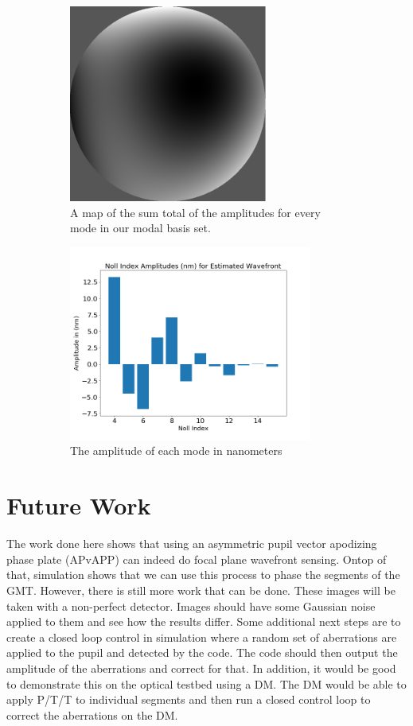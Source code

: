 \begin{figure}[H]
\centering
\begin{subfigure}{.5\textwidth}
  \centering
  \includegraphics[width=6.5cm]{Figures/wavefront_error.png}
  \caption{A map of the sum total of the amplitudes for every mode in our modal basis set.}
  \label{fig:wavefront_map}
\end{subfigure}%
\begin{subfigure}{.5\textwidth}
  \centering
  \includegraphics[width=8cm]{Figures/ampvnoll.png}
  \caption{The amplitude of each mode in nanometers}
  \label{fig:ampvsnoll}
\end{subfigure}
\caption{}
\label{fig:code_results}
\end{figure}


\section{Future Work}
\label{sec:future}

The work done here shows that using an asymmetric pupil vector apodizing phase plate (APvAPP) can indeed do focal plane wavefront sensing.  Ontop of that, simulation shows that we can use this process to phase the segments of the GMT.  However, there is still more work that can be done.  These images will be taken with a non-perfect detector.  Images should have some Gaussian noise applied to them and see how the results differ.  Some additional next steps are to create a closed loop control in simulation where a random set of aberrations are applied to the pupil and detected by the code.  The code should then output the amplitude of the aberrations and correct for that.  In addition, it would be good to demonstrate this on the optical testbed using a DM.  The DM would be able to apply P/T/T to individual segments and then run a closed control loop to correct the aberrations on the DM.  